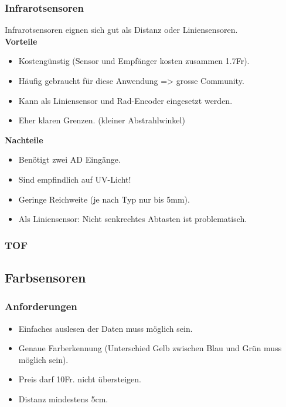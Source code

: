 \subsubsection{Infrarotsensoren}
Infrarotsensoren eignen sich gut als Distanz oder Liniensensoren.\\
\textbf {Vorteile}
\begin{itemize}
\item Kostengünstig (Sensor und Empfänger kosten zusammen 1.7Fr).
\item Häufig gebraucht für diese Anwendung => grosse Community.
\item Kann als Liniensensor und Rad-Encoder eingesetzt werden.
\item Eher klaren Grenzen. (kleiner Abstrahlwinkel)\\
\end{itemize}
\textbf {Nachteile}
\begin{itemize}
\item Benötigt zwei AD Eingänge.
\item Sind empfindlich auf UV-Licht!
\item Geringe Reichweite (je nach Typ nur bis 5mm).
\item Als Liniensensor: Nicht senkrechtes Abtasten ist problematisch.
\end{itemize}

\subsubsection{TOF}

\subsection{Farbsensoren}
\subsubsection{Anforderungen}
\begin{itemize}
\item Einfaches auslesen der Daten muss möglich sein.
\item Genaue Farberkennung (Unterschied Gelb zwischen Blau und Grün muss möglich sein).
\item Preis darf 10Fr. nicht übersteigen.
\item Distanz mindestens 5cm.
\end{itemize}

